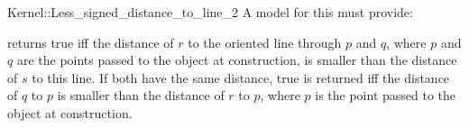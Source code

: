 \begin{ccRefFunctionObjectConcept}{Kernel::Less_signed_distance_to_line_2}
A model for this must provide:


{returns true iff the distance of $r$ to the oriented line 
through $p$ and $q$, where $p$ and $q$ are the points passed
to the object at construction, is smaller than the distance of
$s$ to this line. If both have the same distance, true is
returned iff the distance of $q$ to $p$ is
smaller than the distance of $r$ to $p$, where $p$ is the point
passed to the object at construction.}

\end{ccRefFunctionObjectConcept}

